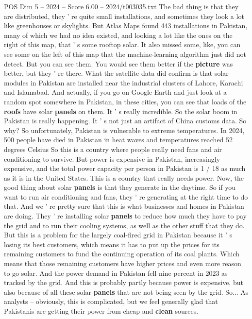 \begin{textsample}{POS Dim 5 – 2024 – Score 6.00 – 2024/t003035.txt}
The bad thing is that they are distributed, they ' re quite small installations, and sometimes they look a lot like greenhouses or skylights.
But Atlas Maps found 443 installations in Pakistan, many of which we had no idea existed, and looking a lot like the ones on the right of this map, that ' s some rooftop solar.
It also missed some, like, you can see some on the left of this map that the machine-learning algorithm just did not detect.
But you can see them.
You would see them better if the \textbf{picture} was better, but they ' re there.
What the satellite data did confirm is that solar modules in Pakistan are installed near the industrial clusters of Lahore, Karachi and Islamabad.
And actually, if you go on Google Earth and just look at a random spot somewhere in Pakistan, in these cities, you can see that loads of the \textbf{roofs} have solar \textbf{panels} on them.
It ' s really incredible.
So the solar boom in Pakistan is really happening.
It ' s not just an artifact of China customs data.
So why?
So unfortunately, Pakistan is vulnerable to extreme temperatures.
In 2024, 500 people have died in Pakistan in heat waves and temperatures reached 52 degrees Celsius So this is a country where people really need fans and air conditioning to survive.
But power is expensive in Pakistan, increasingly expensive, and the total power capacity per person in Pakistan is 1 / 18 as much as it is in the United States.
This is a country that really needs power.
Now, the good thing about solar \textbf{panels} is that they generate in the daytime.
So if you want to run air conditioning and fans, they ' re generating at the right time to do that.
And we ' re pretty sure that this is what businesses and homes in Pakistan are doing.
They ' re installing solar \textbf{panels} to reduce how much they have to pay the grid and to run their cooling systems, as well as the other stuff that they do.
But this is a problem for the largely coal-fired grid in Pakistan because it ' s losing its best customers, which means it has to put up the prices for its remaining customers to fund the continuing operation of its coal plants.
Which means that those remaining customers have higher prices and even more reason to go solar.
And the power demand in Pakistan fell nine percent in 2023 as tracked by the grid.
And this is probably partly because power is expensive, but also because of all these solar \textbf{panels} that are not being seen by the grid.
So...
As analysts -- obviously, this is complicated, but we feel generally glad that Pakistanis are getting their power from cheap and \textbf{clean} sources.

\end{textsample}
